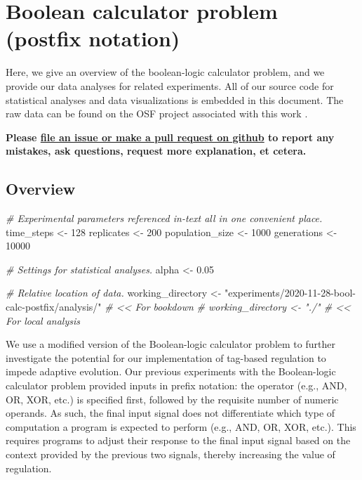 \documentclass[]{book}
\newenvironment{Shaded}{\begin{snugshade}}{\end{snugshade}}
\newcommand{\CommentTok}[1]{\textcolor[rgb]{0.56,0.35,0.01}{\textit{#1}}}
\newcommand{\DecValTok}[1]{\textcolor[rgb]{0.00,0.00,0.81}{#1}}
\newcommand{\FloatTok}[1]{\textcolor[rgb]{0.00,0.00,0.81}{#1}}
\newcommand{\NormalTok}[1]{#1}
\newcommand{\StringTok}[1]{\textcolor[rgb]{0.31,0.60,0.02}{#1}}
\begin{document}
\hypertarget{boolean-calculator-problem-postfix-notation}{%
\chapter{Boolean calculator problem (postfix notation)}\label{boolean-calculator-problem-postfix-notation}}

Here, we give an overview of the boolean-logic calculator problem, and we provide our data analyses for related experiments.
All of our source code for statistical analyses and data visualizations is embedded in this document.
The raw data can be found on the OSF project associated with this work \citep{Lalejini_Moreno_Ofria_Data_2020}.

\textbf{Please \href{https://github.com/amlalejini/Tag-based-Genetic-Regulation-for-LinearGP/issues}{file an issue or make a pull request on github} to report any mistakes, ask questions, request more explanation, et cetera.}

\hypertarget{overview-4}{%
\section{Overview}\label{overview-4}}

\begin{Shaded}
\begin{Highlighting}[]
\CommentTok{# Experimental parameters referenced in-text all in one convenient place.}
\NormalTok{time_steps <-}\StringTok{ }\DecValTok{128}
\NormalTok{replicates <-}\StringTok{ }\DecValTok{200}
\NormalTok{population_size <-}\StringTok{ }\DecValTok{1000}
\NormalTok{generations <-}\StringTok{ }\DecValTok{10000}

\CommentTok{# Settings for statistical analyses.}
\NormalTok{alpha <-}\StringTok{ }\FloatTok{0.05}

\CommentTok{# Relative location of data.}
\NormalTok{working_directory <-}\StringTok{ "experiments/2020-11-28-bool-calc-postfix/analysis/"} \CommentTok{# << For bookdown}
\CommentTok{# working_directory <- "./"                                              # << For local analysis}
\end{Highlighting}
\end{Shaded}

We use a modified version of the Boolean-logic calculator problem to further investigate the potential for our implementation of tag-based regulation to impede adaptive evolution.
Our previous experiments with the Boolean-logic calculator problem provided inputs in prefix notation: the operator (e.g., AND, OR, XOR, etc.) is specified first, followed by the requisite number of numeric operands.
As such, the final input signal does not differentiate which type of computation a program is expected to perform (e.g., AND, OR, XOR, etc.).
This requires programs to adjust their response to the final input signal based on the context provided by the previous two signals, thereby increasing the value of regulation.
\end{document}

